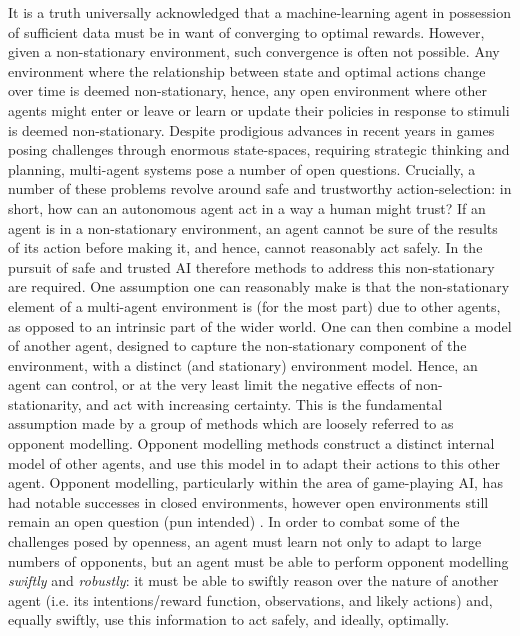 It is a truth universally acknowledged that a machine-learning agent in possession of sufficient data must be in want of converging to optimal rewards. However, given a non-stationary environment, such convergence is often not possible. Any environment where the relationship between state and optimal actions change over time is deemed non-stationary, hence, any open environment where other agents might enter or leave or learn or update their policies in response to stimuli is deemed non-stationary. 
\newline \newline
Despite prodigious advances in recent years in games posing challenges through enormous state-spaces, requiring strategic thinking and planning, multi-agent systems pose a number of open questions. Crucially, a number of these problems revolve around safe and trustworthy action-selection: in short, how can an autonomous agent act in a way a human might trust? If an agent is in a non-stationary environment, an agent cannot be sure of the results of its action before making it, and hence, cannot reasonably act safely. In the pursuit of safe and trusted AI therefore methods to address this non-stationary are required. 
\newline \newline
One assumption one can reasonably make is that the non-stationary element of a multi-agent environment is (for the most part) due to other agents, as opposed to an intrinsic part of the wider world. One can then combine a model of another agent, designed to capture the non-stationary component of the environment, with a distinct (and stationary) environment model. Hence, an agent can control, or at the very least limit the negative effects of non-stationarity, and act with increasing certainty. This is the fundamental assumption made by a group of methods which are loosely referred to as opponent modelling. Opponent modelling methods construct a distinct internal model of other agents, and use this model in to adapt their actions to this other agent. 
\newline \newline
Opponent modelling, particularly within the area of game-playing AI, has had notable successes in closed environments, however open environments still remain an open question (pun intended) \cite{Albrecht_stone_2019}. In order to combat some of the challenges posed by openness, an agent must learn not only to adapt to large numbers of opponents, but an agent must be able to perform opponent modelling \textit{swiftly} and \textit{robustly}: it must be able to swiftly reason over the nature of another agent (i.e. its intentions/reward function, observations, and likely actions) and, equally swiftly, use this information to act safely, and ideally, optimally. 
